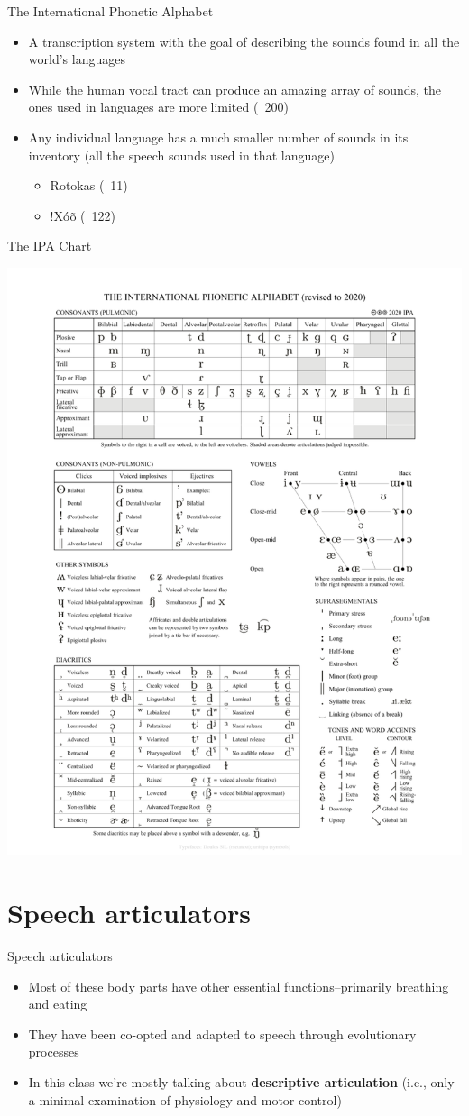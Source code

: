 \documentclass[professionalfonts]{beamer}
\begin{document}
\begin{frame}{The International Phonetic Alphabet}
    \begin{itemize}
        \item A transcription system with the goal of describing the sounds found in all the world’s languages

        \item While the human vocal tract can produce an amazing array of sounds, the ones used in languages are more limited (~200)

        \item Any individual language has a much smaller number of sounds in its inventory (all the speech sounds used in that language)
        \begin{itemize}
            \item Rotokas (~11)
            \item !Xóõ (~122)
        \end{itemize}
    \end{itemize}
\end{frame}

\begin{frame}{The IPA Chart}
    \begin{center}
        \includegraphics[width = .5\textwidth]{figs/IPAChart.png}
    \end{center}
\end{frame}

\section{Speech articulators}
\begin{frame}{Speech articulators}
    \begin{itemize}
        \item Most of these body parts have other essential functions--primarily breathing and eating
        \item They have been co-opted and adapted to speech through evolutionary processes
        \item In this class we're mostly talking about \textbf{descriptive articulation} (i.e., only a minimal examination of physiology and motor control)
    \end{itemize}
\end{frame}
\end{document}
